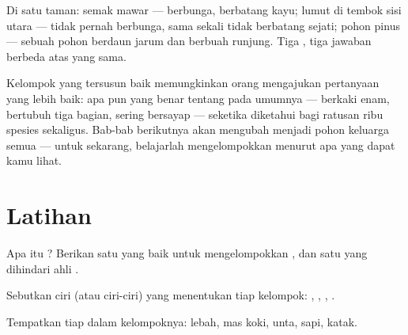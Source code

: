 \begin{example}\label{ex:g3:sorting-living-things:park}
Di satu taman: semak mawar --- berbunga, berbatang kayu; lumut di
tembok sisi utara --- tidak pernah berbunga, sama sekali tidak
berbatang sejati; pohon pinus --- sebuah pohon berdaun jarum dan
berbuah runjung. Tiga , tiga jawaban berbeda atas 
yang sama.
\end{example}

\begin{remark}\label{rem:g3:sorting-living-things:science}
Kelompok yang tersusun baik memungkinkan orang mengajukan pertanyaan
yang lebih baik: apa pun yang benar tentang  pada umumnya ---
berkaki enam, bertubuh tiga bagian, sering bersayap --- seketika
diketahui bagi ratusan ribu spesies sekaligus. Bab-bab berikutnya akan
mengubah  menjadi pohon keluarga semua  ---
untuk sekarang, belajarlah mengelompokkan menurut apa yang dapat kamu
lihat.
\end{remark}

\section{Latihan}

\begin{exercise}[$\star$]\label{exo:g3:sorting-living-things:1}
Apa itu ? Berikan satu  yang baik untuk mengelompokkan
, dan satu yang dihindari ahli .
\end{exercise}

\begin{exercise}[$\star$]\label{exo:g3:sorting-living-things:2}
Sebutkan ciri (atau ciri-ciri) yang menentukan tiap kelompok:
, , , .
\end{exercise}

\begin{exercise}[$\star$]\label{exo:g3:sorting-living-things:3}
Tempatkan tiap  dalam kelompoknya: lebah,  mas koki, 
unta, sapi, katak.
\end{exercise}

